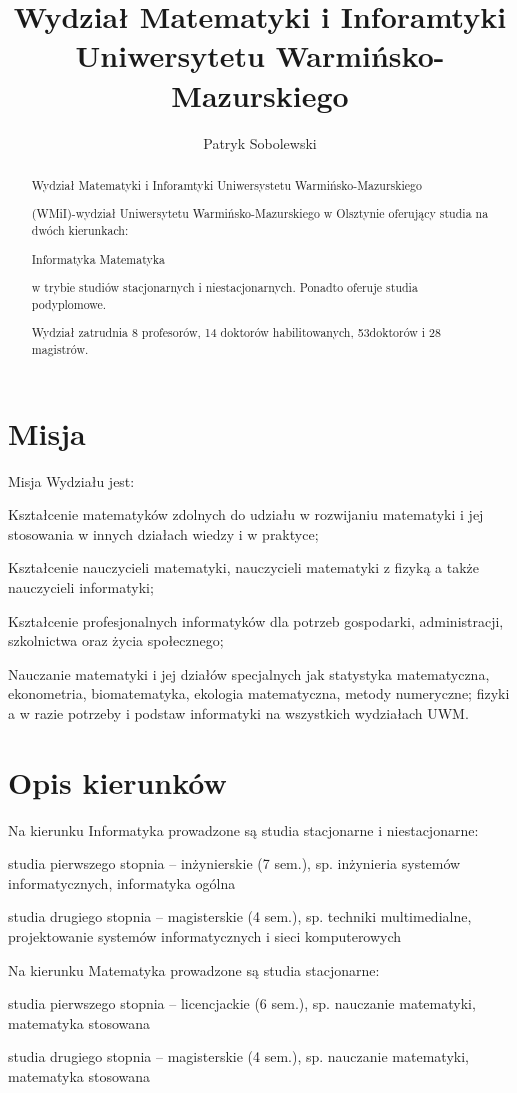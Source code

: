 \documentclass[a4paper,12pt]{article}
\title{Wydział Matematyki i Inforamtyki Uniwersytetu Warmińsko-Mazurskiego}
\author{Patryk Sobolewski}
\begin{document}
\maketitle
\begin{abstract}
Wydział Matematyki i Inforamtyki Uniwersystetu Warmińsko-Mazurskiego

(WMiI)-wydział Uniwersytetu Warmińsko-Mazurskiego w Olsztynie oferujący studia na dwóch kierunkach:

Informatyka
Matematyka

w trybie studiów stacjonarnych i niestacjonarnych. Ponadto oferuje studia podyplomowe.

Wydział zatrudnia 8 profesorów, 14 doktorów habilitowanych, 53doktorów i 28 magistrów.

\end{abstract}
\section{Misja}
Misja Wydziału jest:

Kształcenie matematyków zdolnych do udziału w rozwijaniu matematyki i jej stosowania w innych działach wiedzy i w praktyce;

Kształcenie nauczycieli matematyki, nauczycieli matematyki z fizyką a także nauczycieli informatyki;

Kształcenie profesjonalnych informatyków dla potrzeb gospodarki, administracji, szkolnictwa oraz życia
społecznego;

Nauczanie matematyki i jej działów specjalnych jak statystyka matematyczna, ekonometria,
biomatematyka, ekologia matematyczna, metody numeryczne; fizyki a w razie potrzeby i podstaw
informatyki na wszystkich wydziałach UWM.

\section{Opis kierunków}
Na kierunku Informatyka prowadzone są studia stacjonarne i niestacjonarne:

studia pierwszego stopnia – inżynierskie (7 sem.), sp. inżynieria systemów informatycznych, informatyka
ogólna


studia drugiego stopnia – magisterskie (4 sem.), sp. techniki multimedialne, projektowanie systemów
informatycznych i sieci komputerowych



Na kierunku Matematyka prowadzone są studia stacjonarne:

studia pierwszego stopnia – licencjackie (6 sem.), sp. nauczanie matematyki, matematyka stosowana

studia drugiego stopnia – magisterskie (4 sem.), sp. nauczanie matematyki, matematyka stosowana
\end{document}
